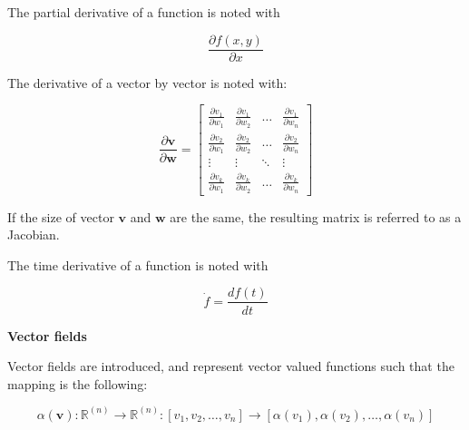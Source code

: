  The partial derivative of a function is noted with

\begin{equation}
\frac{\partial{f(x,y)}}{\partial{x}}
\end{equation}



The derivative of a vector by vector is noted with:

\begin{equation}
\frac{\partial{\bm{v}}}{\partial{\bm{w}}} =
\begin{bmatrix}
    \frac{\partial v_{1}}{\partial w_1} & \frac{\partial v_{1}}{\partial w_2} &  \dots  & \frac{\partial v_{1}}{\partial w_n} \\
    \frac{\partial v_{2}}{\partial w_1} & \frac{\partial v_{2}}{\partial w_2} &  \dots  & \frac{\partial v_{2}}{\partial w_n} \\
    \vdots & \vdots &  \ddots & \vdots \\
    \frac{\partial v_{k}}{\partial w_1} & \frac{\partial v_{k}}{\partial w_2} &  \dots  & \frac{\partial v_{k}}{\partial w_n}
\end{bmatrix}
\end{equation}

If the size of vector $\bm{v}$ and $\bm{w}$ are the same, the resulting matrix is referred to as a Jacobian.

The time derivative of a function is noted with

\begin{equation}
\dot{f} = \frac{d f(t)}{dt}
\end{equation}

\textbf{Vector fields}

Vector fields are introduced, and represent vector valued functions such that the mapping is the following:

\begin{equation}
\alpha(\bm{v}) : \pmb{{\mathbb{R}}}^{(n)} \rightarrow \pmb{{\mathbb{R}}}^{(n)} : [v_1, v_2, \hdots, v_n] \rightarrow [\alpha(v_1), \alpha(v_2),\hdots,\alpha(v_n)]
\end{equation}



